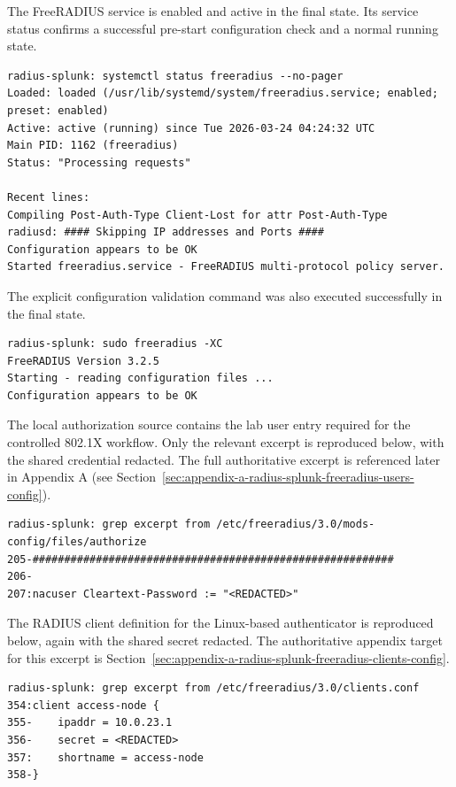 \documentclass[11pt]{article}
\begin{document}
The FreeRADIUS service is enabled and active in the final state. Its service status confirms a successful pre-start configuration check and a normal running state.

\begin{verbatim}
radius-splunk: systemctl status freeradius --no-pager
Loaded: loaded (/usr/lib/systemd/system/freeradius.service; enabled; preset: enabled)
Active: active (running) since Tue 2026-03-24 04:24:32 UTC
Main PID: 1162 (freeradius)
Status: "Processing requests"

Recent lines:
Compiling Post-Auth-Type Client-Lost for attr Post-Auth-Type
radiusd: #### Skipping IP addresses and Ports ####
Configuration appears to be OK
Started freeradius.service - FreeRADIUS multi-protocol policy server.
\end{verbatim}

The explicit configuration validation command was also executed successfully in the final state.

\begin{verbatim}
radius-splunk: sudo freeradius -XC
FreeRADIUS Version 3.2.5
Starting - reading configuration files ...
Configuration appears to be OK
\end{verbatim}

The local authorization source contains the lab user entry required for the controlled 802.1X workflow. Only the relevant excerpt is reproduced below, with the shared credential redacted. The full authoritative excerpt is referenced later in Appendix A (see Section~\ref{sec:appendix-a-radius-splunk-freeradius-users-config}).

\begin{verbatim}
radius-splunk: grep excerpt from /etc/freeradius/3.0/mods-config/files/authorize
205-#########################################################
206-
207:nacuser Cleartext-Password := "<REDACTED>"
\end{verbatim}

The RADIUS client definition for the Linux-based authenticator is reproduced below, again with the shared secret redacted. The authoritative appendix target for this excerpt is Section~\ref{sec:appendix-a-radius-splunk-freeradius-clients-config}.

\begin{verbatim}
radius-splunk: grep excerpt from /etc/freeradius/3.0/clients.conf
354:client access-node {
355-    ipaddr = 10.0.23.1
356-    secret = <REDACTED>
357:    shortname = access-node
358-}
\end{verbatim}
\end{document}
